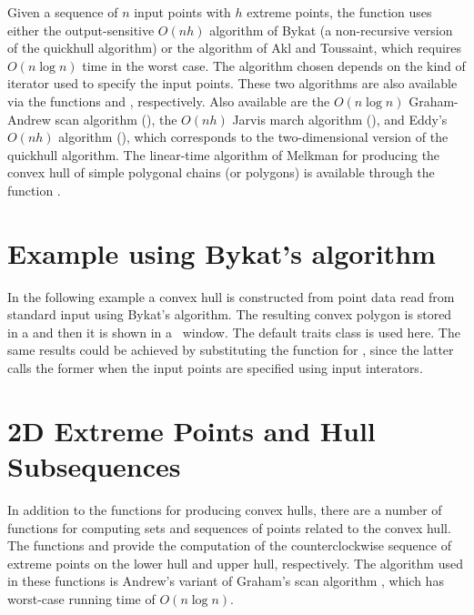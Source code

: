 Given a sequence of $n$ input points with $h$ extreme points,
the function 
uses either the output-sensitive $O(n h)$ algorithm of Bykat \cite{b-chfsp-78}
(a non-recursive version of the quickhull \cite{bdh-qach-96} algorithm)%
or the algorithm of Akl and Toussaint, which requires $O(n \log n)$ time
in the worst case.  The algorithm chosen depends on the kind of 
iterator used to specify the input points.  These two algorithms are
also available via the functions  and ,
respectively.  Also available are 
the $O(n \log n)$ Graham-Andrew scan algorithm \cite{a-aeach-79,m-mdscg-84} 
(), 
the $O(n h)$ Jarvis march algorithm \cite{j-ichfs-73}
(),
and Eddy's $O(n h)$ algorithm \cite{e-nchap-77}
(), which corresponds to the 
two-dimensional version of the quickhull algorithm.
The linear-time algorithm of Melkman for producing the convex hull of 
simple polygonal chains (or polygons) is available through the function
.%

\section{Example using Bykat's algorithm}

In the following example a convex hull is constructed from point data read
from standard input using Bykat's algorithm.  The resulting convex polygon
is stored in a  and then it is shown in a \cgal\ window.
The default traits class is used here.  The same results could be
achieved by substituting the function  for
, since the latter calls the former when the
input points are specified using input interators.




\section{2D Extreme Points and Hull Subsequences}
In addition to the functions for producing convex hulls, there are a
number of functions for computing sets and sequences of points related
to the convex hull.  
The functions 
and 
provide the computation of the counterclockwise 
sequence of extreme points on the lower hull and upper hull,
respectively.  The algorithm used in these functions is
Andrew's variant of Graham's scan algorithm \cite{a-aeach-79,m-mdscg-84},
which has worst-case running time of $O(n \log n)$.

